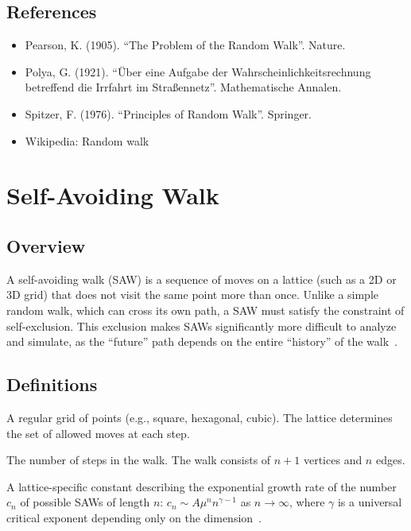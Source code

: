 \subsection{References}
\begin{itemize}
    \item Pearson, K. (1905). ``The Problem of the Random Walk''. Nature.
    \item Polya, G. (1921). ``\"Uber eine Aufgabe der Wahrscheinlichkeitsrechnung betreffend die Irrfahrt im Stra{\ss}ennetz''. Mathematische Annalen.
    \item Spitzer, F. (1976). ``Principles of Random Walk''. Springer.
    \item Wikipedia: Random walk
\end{itemize}


\section{Self-Avoiding Walk}
\label{sec:self_avoiding_walk}

\subsection{Overview}
A self-avoiding walk (SAW) is a sequence of moves on a lattice (such as a 2D or 3D grid) that does not visit the same point more than once. Unlike a simple random walk, which can cross its own path, a SAW must satisfy the constraint of self-exclusion. This exclusion makes SAWs significantly more difficult to analyze and simulate, as the ``future'' path depends on the entire ``history'' of the walk~\cite{madras1996}.

\subsection{Definitions}
\begin{definition}[Lattice]\label{def:saw_lattice}
A regular grid of points (e.g., square, hexagonal, cubic). The lattice determines the set of allowed moves at each step.
\end{definition}

\begin{definition}[Length ($n$)]\label{def:saw_length}
The number of steps in the walk. The walk consists of $n + 1$ vertices and $n$ edges.
\end{definition}

\begin{definition}\label{def:connective_constant}
A lattice-specific constant describing the exponential growth rate of the number $c_n$ of possible SAWs of length $n$: $c_n \sim A \mu^n n^{\gamma - 1}$ as $n \to \infty$, where $\gamma$ is a universal critical exponent depending only on the dimension~\cite{madras1996}.
\end{definition}

